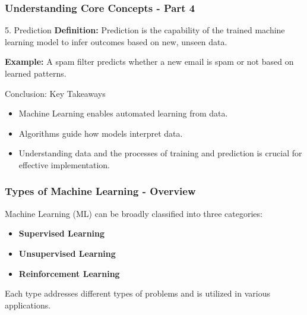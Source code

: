 \documentclass[aspectratio=169]{beamer}
\begin{document}
\begin{frame}[fragile]
    \frametitle{Understanding Core Concepts - Part 4}
    \begin{block}{5. Prediction}
        \textbf{Definition:}  
        Prediction is the capability of the trained machine learning model to infer outcomes based on new, unseen data.

        \textbf{Example:} A spam filter predicts whether a new email is spam or not based on learned patterns.
    \end{block}

    \begin{block}{Conclusion: Key Takeaways}
        \begin{itemize}
            \item Machine Learning enables automated learning from data.
            \item Algorithms guide how models interpret data.
            \item Understanding data and the processes of training and prediction is crucial for effective implementation.
        \end{itemize}
    \end{block}
\end{frame}

\begin{frame}[fragile]
    \frametitle{Types of Machine Learning - Overview}
    Machine Learning (ML) can be broadly classified into three categories:
    
    \begin{itemize}
        \item \textbf{Supervised Learning}
        \item \textbf{Unsupervised Learning}
        \item \textbf{Reinforcement Learning}
    \end{itemize}
    
    Each type addresses different types of problems and is utilized in various applications.
\end{frame}
\end{document}
